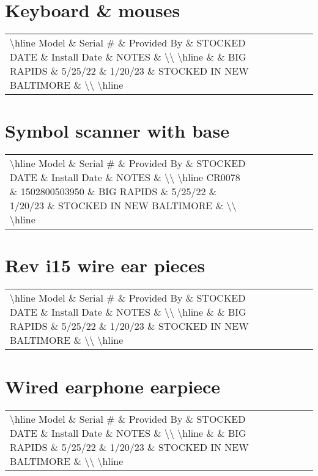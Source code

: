 \documentclass{article}%
\begin{document}
%
\section{Keyboard \& mouses}%
\label{sec:Keyboardmouses}%
\begin{tabularx}{\textwidth}{|X|X|X|X|X|X|X|}%
\textbackslash{}hline%
Model \& Serial \# \& Provided By \& STOCKED DATE \& Install Date \& NOTES \&  \textbackslash{}\textbackslash{}%
\textbackslash{}hline%
 \&  \& BIG RAPIDS \& 5/25/22 \& 1/20/23 \& STOCKED IN NEW BALTIMORE \&  \textbackslash{}\textbackslash{}%
\textbackslash{}hline%
\end{tabularx}

%
\section{Symbol scanner with base}%
\label{sec:Symbolscannerwithbase}%
\begin{tabularx}{\textwidth}{|X|X|X|X|X|X|X|}%
\textbackslash{}hline%
Model \& Serial \# \& Provided By \& STOCKED DATE \& Install Date \& NOTES \&  \textbackslash{}\textbackslash{}%
\textbackslash{}hline%
CR0078 \& 1502800503950 \& BIG RAPIDS \& 5/25/22 \& 1/20/23 \& STOCKED IN NEW BALTIMORE \&  \textbackslash{}\textbackslash{}%
\textbackslash{}hline%
\end{tabularx}

%
\section{Rev i15 wire ear pieces}%
\label{sec:Revi15wireearpieces}%
\begin{tabularx}{\textwidth}{|X|X|X|X|X|X|X|}%
\textbackslash{}hline%
Model \& Serial \# \& Provided By \& STOCKED DATE \& Install Date \& NOTES \&  \textbackslash{}\textbackslash{}%
\textbackslash{}hline%
 \&  \& BIG RAPIDS \& 5/25/22 \& 1/20/23 \& STOCKED IN NEW BALTIMORE \&  \textbackslash{}\textbackslash{}%
\textbackslash{}hline%
\end{tabularx}

%
\section{Wired earphone earpiece}%
\label{sec:Wiredearphoneearpiece}%
\begin{tabularx}{\textwidth}{|X|X|X|X|X|X|X|}%
\textbackslash{}hline%
Model \& Serial \# \& Provided By \& STOCKED DATE \& Install Date \& NOTES \&  \textbackslash{}\textbackslash{}%
\textbackslash{}hline%
 \&  \& BIG RAPIDS \& 5/25/22 \& 1/20/23 \& STOCKED IN NEW BALTIMORE \&  \textbackslash{}\textbackslash{}%
\textbackslash{}hline%
\end{tabularx}
\end{document}
